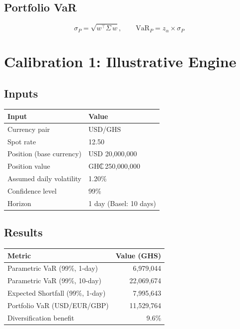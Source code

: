 \documentclass[11pt,a4paper]{article}
\newcommand{\ghs}[1]{\textnormal{GH₵\,#1}}
\begin{document}
\subsection{Portfolio VaR}
\begin{equation}
\sigma_P = \sqrt{w^\top \Sigma\, w}, \qquad
\text{VaR}_P = z_\alpha \times \sigma_P
\end{equation}

\section{Calibration 1: Illustrative Engine}

\subsection{Inputs}

\begin{table}[h!]
\centering
\renewcommand{\arraystretch}{1.3}
\begin{tabular}{L{7cm} L{7cm}}
\toprule
\textbf{Input} & \textbf{Value} \\
\midrule
Currency pair              & USD/GHS \\
Spot rate                  & 12.50 \\
Position (base currency)   & USD 20{,}000{,}000 \\
Position value             & \ghs{250{,}000{,}000} \\
Assumed daily volatility   & 1.20\% \\
Confidence level           & 99\% \\
Horizon                    & 1 day (Basel: 10 days) \\
\bottomrule
\end{tabular}
\end{table}

\subsection{Results}

\begin{table}[h!]
\centering
\renewcommand{\arraystretch}{1.3}
\begin{tabular}{L{7cm} r}
\toprule
\textbf{Metric} & \textbf{Value (GHS)} \\
\midrule
Parametric VaR (99\%, 1-day)     & 6{,}979{,}044 \\
Parametric VaR (99\%, 10-day)    & 22{,}069{,}674 \\
Expected Shortfall (99\%, 1-day) & 7{,}995{,}643 \\
Portfolio VaR (USD/EUR/GBP)      & 11{,}529{,}764 \\
Diversification benefit          & 9.6\% \\
\bottomrule
\end{tabular}
\end{table}
\end{document}
